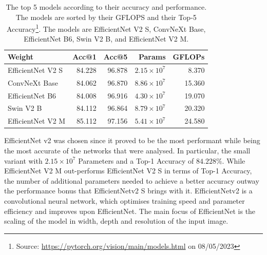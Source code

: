 \begin{table}[htbp]
  \caption[Top 5 models for Accuracy and Performance]{The top 5 models according to their accuracy and performance. The models are sorted by their GFLOPS and their Top-5 Accuracy\footnote{Source: \url{https://pytorch.org/vision/main/models.html} on 08/05/2023}. The models are EfficientNet V2 S, ConvNeXt Base, EfficientNet B6, Swin V2 B, and EfficientNet V2 M.}
  \label{tab:network_comparison}
  \centering
  \begin{tabular}{lrrrr}
    \hline
            Weight &  Acc@1 &  Acc@5 &   Params &  GFLOPs \\
    \hline
  EfficientNet V2 S & 84.228 & 96.878 & $2.15 \times 10^7$ &   8.370 \\
      ConvNeXt Base & 84.062 & 96.870 & $8.86 \times 10^7$ &  15.360 \\
    EfficientNet B6 & 84.008 & 96.916 & $4.30 \times 10^7$ &  19.070 \\
          Swin V2 B & 84.112 & 96.864 & $8.79 \times 10^7$ &  20.320 \\
  EfficientNet V2 M & 85.112 & 97.156 & $5.41 \times 10^7$ &  24.580 \\
  \hline
  \end{tabular}
\end{table}

EfficientNet v2 was chosen since it proved to be the most performant while being the most accurate of the networks that were analysed. In particular, the small variant with $2.15 \times 10^7$ Parameters and a Top-1 Accuracy of $84.228\%$\cite{tan2021efficientnetv2}.  While EfficientNet V2 M out-performs EfficientNet V2 S in terms of Top-1 Accuracy, the number of additional parameters needed to achieve a better accuracy outway the performance bonus that EfficientNetv2 S brings with it. EfficientNetv2 is a convolutional neural network, which optimises training speed and parameter efficiency and improves upon EfficientNet\cite{tan2020efficientnet}. The main focus of EfficientNet is the scaling of the model in width, depth and resolution of the input image. 

\FloatBarrier